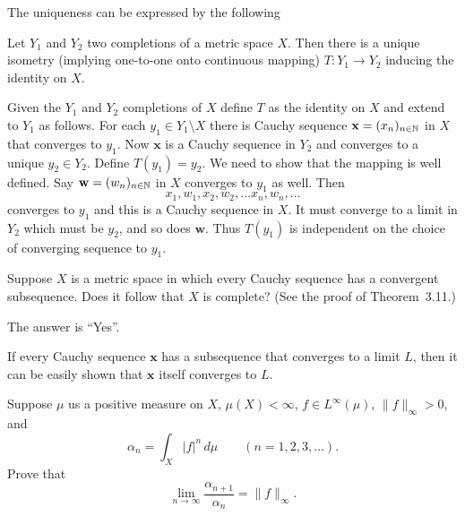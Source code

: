 \begin{enumerate}
The uniqueness can be expressed by the following
\begin{llem}
Let \(Y_1\) and \(Y_2\) two completions of a metric space $X$.
Then there is a unique isometry (implying one-to-one onto continuous mapping)
\(T:Y_1\to Y_2\) inducing the identity on $X$.
\end{llem}
\begin{thmproof}
Given the \(Y_1\) and \(Y_2\) completions of $X$
define $T$ as the identity on $X$ and extend to \(Y_1\) as follows.
For each \(y_1\in Y_1\setminus X\)
there is Cauchy sequence \(\mathbf{x} = (x_n)_{n\in\mathbb{N}}\) in $X$
that converges to \(y_1\). Now \(\mathbf{x}\) is a Cauchy sequence
in \(Y_2\) and converges to a unique \(y_2\in Y_2\).
Define \(T(y_1) = y_2\). We need to show that the mapping is well defined.
Say \(\mathbf{w} = (w_n)_{n\in\mathbb{N}}\) in $X$ converges to \(y_1\) as well.
Then
\begin{equation*}
 x_1, w_1, x_2, w_2, \ldots x_n, w_n, \ldots
\end{equation*}
converges to \(y_1\) and this is a Cauchy sequence in $X$.
It must converge to a limit in \(Y_2\) which must be \(y_2\),
and so does \(\mathbf{w}\). Thus \(T(y_1)\) is independent on the choice
of converging sequence to \(y_1\).
\end{thmproof}

\begin{excopy}
Suppose $X$ is a metric space in which every Cauchy sequence has a convergent
subsequence. Does it follow that $X$ is complete?
(See the proof of Theorem~3.11.)
\end{excopy}

The answer is ``Yes''.

If every Cauchy sequence \(\mathbf{x}\)
has a subsequence that converges to a limit $L$, then it can be easily
shown that  \(\mathbf{x}\) itself converges to $L$.

\begin{excopy}
Suppose \(\mu\) us a positive measure on $X$, \(\mu(X)<\infty\),
\(f\in L^\infty(\mu)\), \(\|f\|_\infty > 0\), and
\begin{equation*}
\alpha_n = \int_X |f|^n\,d\mu \qquad (n=1,2,3,\ldots).
\end{equation*}
Prove that
\begin{equation*}
 \lim_{n\to \infty} \frac{\alpha_{n+1}}{\alpha_n} = \|f\|_\infty.
\end{equation*}
\end{excopy}


\end{enumerate}
